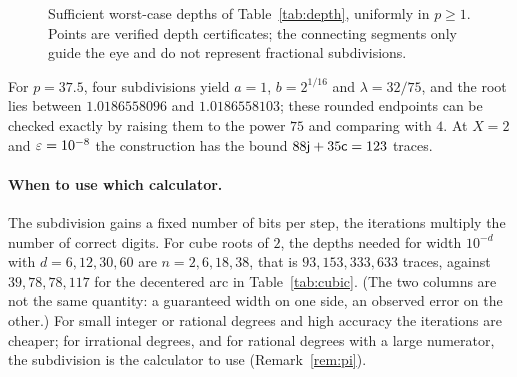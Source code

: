\begin{figure}[h]
\centering\figDepth
\caption{Sufficient worst-case depths of Table~\ref{tab:depth}, uniformly in $p\ge1$. Points are
verified depth certificates; the connecting segments only guide the eye and do not represent fractional
subdivisions.}\label{fig:depth}
\end{figure}

For $p=37.5$, four subdivisions yield $a=1$, $b=2^{1/16}$ and $\lambda=32/75$, and the root lies between
$1.0186558096$ and $1.0186558103$; these rounded endpoints can be checked exactly by raising them to the
power $75$ and comparing with $4$. At $X=2$ and $\varepsilon=10^{-8}$ the construction has the bound
$88\mathsf{j}+35\mathsf{c}=123$ traces.

\paragraph{When to use which calculator.}
The subdivision gains a fixed number of bits per step, the iterations multiply the number of correct
digits. For cube roots of $2$, the depths needed for width $10^{-d}$ with $d=6,12,30,60$ are
$n=2,6,18,38$, that is $93,153,333,633$ traces, against $39,78,78,117$ for the decentered arc in
Table~\ref{tab:cubic}. (The two columns are not the same quantity: a guaranteed width on one side, an
observed error on the other.) For small integer or rational degrees and high accuracy the iterations
are cheaper; for irrational degrees, and for rational degrees with a large numerator, the subdivision
is the calculator to use (Remark~\ref{rem:pi}).
